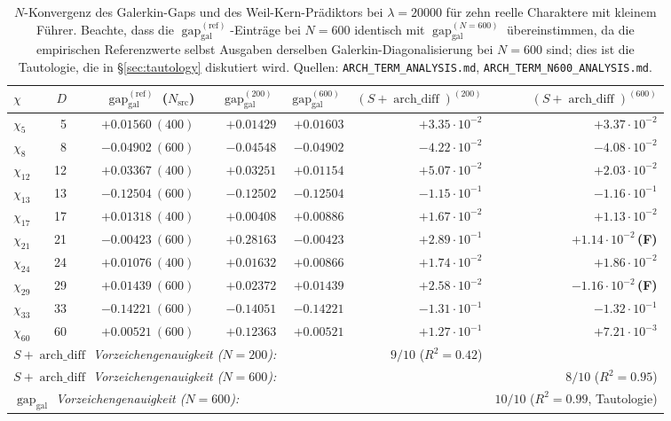 \documentclass[a4paper,10pt,twocolumn]{article}
\theoremstyle{definition}
\theoremstyle{remark}
\newcommand{\gap}{\operatorname{gap}}
\newcommand{\chifn}{\chi}
\newcommand{\archdiff}{\operatorname{arch\_diff}}
\begin{document}
\begin{table}[t]
\caption{$N$-Konvergenz des Galerkin-Gaps und des Weil-Kern-Prädiktors
  bei $\lambda=20000$ für zehn reelle Charaktere mit kleinem Führer. Beachte, dass
  die $\gap_{\mathrm{gal}}^{(\mathrm{ref})}$-Einträge bei $N=600$ identisch mit
  $\gap_{\mathrm{gal}}^{(N=600)}$ übereinstimmen, da die empirischen Referenzwerte
  selbst Ausgaben derselben Galerkin-Diagonalisierung bei $N=600$ sind;
  dies ist die Tautologie, die in \S\ref{sec:tautology} diskutiert wird.
  Quellen: \texttt{ARCH\_TERM\_ANALYSIS.md}, \texttt{ARCH\_TERM\_N600\_ANALYSIS.md}.}
\label{tab:validation}
\centering
\small
\begin{tabular}{@{}lrrrrrr@{}}
\toprule
$\chifn$ & $D$ & $\gap_{\mathrm{gal}}^{(\mathrm{ref})}$ ($N_\mathrm{src}$) & $\gap_{\mathrm{gal}}^{(200)}$ & $\gap_{\mathrm{gal}}^{(600)}$ & $(S+\archdiff)^{(200)}$ & $(S+\archdiff)^{(600)}$ \\
\midrule
$\chi_5$  &  5 & $+0.01560\ (400)$ & $+0.01429$ & $+0.01603$ & $+3.35\!\cdot\!10^{-2}$ & $+3.37\!\cdot\!10^{-2}$ \\
$\chi_8$  &  8 & $-0.04902\ (600)$ & $-0.04548$ & $-0.04902$ & $-4.22\!\cdot\!10^{-2}$ & $-4.08\!\cdot\!10^{-2}$ \\
$\chi_{12}$ & 12 & $+0.03367\ (400)$ & $+0.03251$ & $+0.01154$ & $+5.07\!\cdot\!10^{-2}$ & $+2.03\!\cdot\!10^{-2}$ \\
$\chi_{13}$ & 13 & $-0.12504\ (600)$ & $-0.12502$ & $-0.12504$ & $-1.15\!\cdot\!10^{-1}$ & $-1.16\!\cdot\!10^{-1}$ \\
$\chi_{17}$ & 17 & $+0.01318\ (400)$ & $+0.00408$ & $+0.00886$ & $+1.67\!\cdot\!10^{-2}$ & $+1.13\!\cdot\!10^{-2}$ \\
$\chi_{21}$ & 21 & $-0.00423\ (600)$ & $\mathbf{+0.28163}$ & $-0.00423$ & $+2.89\!\cdot\!10^{-1}$ & $+1.14\!\cdot\!10^{-2}$\,\textbf{(F)} \\
$\chi_{24}$ & 24 & $+0.01076\ (400)$ & $+0.01632$ & $+0.00866$ & $+1.74\!\cdot\!10^{-2}$ & $+1.86\!\cdot\!10^{-2}$ \\
$\chi_{29}$ & 29 & $+0.01439\ (600)$ & $+0.02372$ & $+0.01439$ & $+2.58\!\cdot\!10^{-2}$ & $-1.16\!\cdot\!10^{-2}$\,\textbf{(F)} \\
$\chi_{33}$ & 33 & $-0.14221\ (600)$ & $-0.14051$ & $-0.14221$ & $-1.31\!\cdot\!10^{-1}$ & $-1.32\!\cdot\!10^{-1}$ \\
$\chi_{60}$ & 60 & $+0.00521\ (600)$ & $+0.12363$ & $+0.00521$ & $+1.27\!\cdot\!10^{-1}$ & $+7.21\!\cdot\!10^{-3}$ \\
\midrule
\multicolumn{4}{l}{\textit{$S+\archdiff$ Vorzeichengenauigkeit ($N=200$):}} & & $9/10$ ($R^2=0.42$) & \\
\multicolumn{4}{l}{\textit{$S+\archdiff$ Vorzeichengenauigkeit ($N=600$):}} & & & $8/10$ ($R^2=0.95$) \\
\multicolumn{4}{l}{\textit{$\gap_{\mathrm{gal}}$ Vorzeichengenauigkeit ($N=600$):}} & & & $10/10$ ($R^2=0.99$, Tautologie) \\
\bottomrule
\end{tabular}
\end{table}
\end{document}
